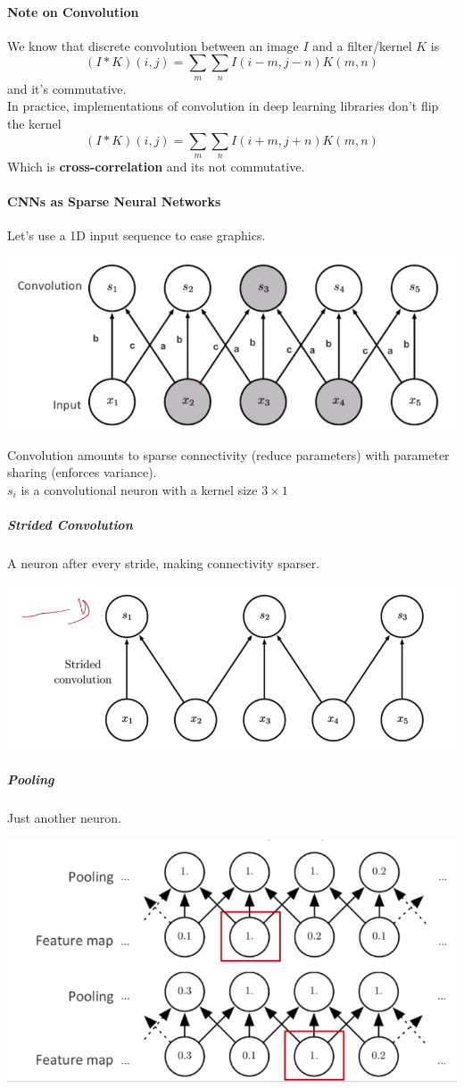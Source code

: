 \documentclass[10pt]{report}
\begin{document}
\paragraph{Note on Convolution} We know that discrete convolution between an image $I$ and a filter/kernel $K$ is
$$(I*K)(i,j) = \sum_m\sum_nI(i-m,j-n)K(m,n)$$
and it's commutative.\\
In practice, implementations of convolution in deep learning libraries don't flip the kernel
$$(I*K)(i,j) = \sum_m\sum_nI(i+m,j+n)K(m,n)$$
Which is \textbf{cross-correlation} and its not commutative.
\paragraph{CNNs as Sparse Neural Networks}
Let's use a 1D input sequence to ease graphics.
\begin{center}
	\includegraphics[scale=0.5]{57.png}
\end{center}
Convolution amounts to sparse connectivity (reduce parameters) with parameter sharing (enforces variance).\\
$s_i$ is a convolutional neuron with a kernel size $3\times1$
\subparagraph{Strided Convolution} A neuron after every stride, making connectivity sparser.
\begin{center}
	\includegraphics[scale=0.5]{58.png}
\end{center}
\pagebreak
\subparagraph{Pooling} Just another neuron.
\begin{center}
	\includegraphics[scale=0.5]{59.png}
\end{center}
\end{document}
